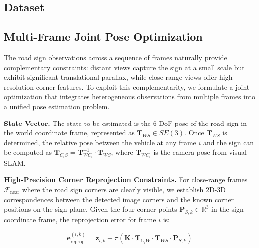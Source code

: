 \documentclass[runningheads]{llncs}
\begin{document}
\subsection{Dataset}




\subsection{Multi-Frame Joint Pose Optimization}

The road sign observations across a sequence of frames naturally provide complementary
constraints: distant views capture the sign at a small scale but exhibit significant
translational parallax, while close-range views offer high-resolution corner features.
To exploit this complementarity, we formulate a joint optimization that integrates
heterogeneous observations from multiple frames into a unified pose estimation problem.

\noindent\textbf{State Vector.}
The state to be estimated is the 6-DoF pose of the road sign in the world coordinate
frame, represented as $\mathbf{T}_{WS} \in SE(3)$. Once $\mathbf{T}_{WS}$ is
determined, the relative pose between the vehicle at any frame $i$ and the sign can
be computed as $\mathbf{T}_{C_iS} = \mathbf{T}_{WC_i}^{-1} \cdot \mathbf{T}_{WS}$,
where $\mathbf{T}_{WC_i}$ is the camera pose from visual SLAM.

\noindent\textbf{High-Precision Corner Reprojection Constraints.}
For close-range frames $\mathcal{F}_{\text{near}}$ where the road sign corners are
clearly visible, we establish 2D-3D correspondences between the detected image corners
and the known corner positions on the sign plane. Given the four corner points
$\mathbf{P}_{S,k} \in \mathbb{R}^3$ in the sign coordinate frame, the reprojection
error for frame $i$ is:

\begin{equation}
\mathbf{e}_{\text{reproj}}^{(i,k)} = \mathbf{z}_{i,k} -
\pi\left( \mathbf{K} \cdot \mathbf{T}_{C_iW} \cdot \mathbf{T}_{WS} \cdot
\mathbf{P}_{S,k} \right)
\label{eq:reproj_error}
\end{equation}
\end{document}
